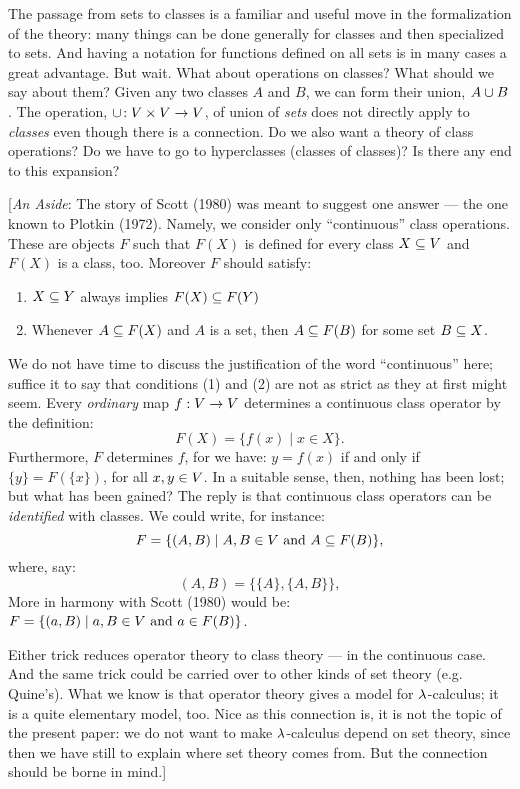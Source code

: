 The passage from sets to classes is a familiar and useful move in the formalization of the
theory: many things can be done generally for classes and then specialized to sets. And
having a notation for functions defined on all sets is in many cases a great advantage.
But wait. What about operations on classes? What should we say about them? Given any two
classes $A$ and $B$, we can form their union, $A \cup  B$. The operation, $\cup\!: V
\times V \rightarrow V$, of union of {\it sets} does not directly apply to {\it classes} even
though there is a connection. Do we also want a theory of class operations? Do we have to
go to hyperclasses (classes of classes)? Is there any end to this expansion?


[{\it An Aside}: The story of Scott (1980) was meant to suggest one answer --- the one
known to Plotkin (1972). Namely, we consider only ``continuous'' class operations. These
are objects $F$ such that $F(X)$ is defined for every class $X \subseteq V$ and $F(X)$ is
a class, too. Moreover $F$ should satisfy:

\begin{enumerate}

\item $X \subseteq Y$ always implies $F(X)\subseteq F(Y)$

\item Whenever $A \subseteq F(X)$ and $A$ is a set, then $A\subseteq F(B)$ for some set $B \subseteq X$.

\end{enumerate}
%
We do not have time to discuss the justification of the word ``continuous'' here; suffice
it to say that conditions (1) and (2) are not as strict as they at first might seem. Every
{\it ordinary} map $f : V \rightarrow V$ determines a continuous class operator by the
definition:
$$
F(X) = \{f(x) \mid x \in X\}.
$$
%
Furthermore, $F$ determines $f$, for we have: $y = f(x)$ if and only if $\{y\} =
F(\{x\})$, for all $x,y \in V$. In a suitable sense, then, nothing has been lost; but
what has been gained? The reply is that continuous class operators can be {\it identified}
with classes. We could write, for instance:
$$ F = \{(A,B) \mid A,B \in V {\textrm { and }} A \subseteq F(B) \},$$ where, say:
$$
(A,B) = \{\{A\}, \{A,B\}\},
$$
More in harmony with Scott (1980) would be: $F = \{(a,B) \mid  a,B \in V {\textrm { and }
} a \in F(B)\}$.

Either trick reduces operator theory to class theory --- in the continuous case. And the
same trick could be carried over to other kinds of set theory (e.g. Quine's). What we know
is that operator theory gives a model for $\lambda$-calculus; it is a quite elementary model,
too. Nice as this connection is, it is not the topic of the present paper: we do not want
to make $\lambda$-calculus depend on set theory, since then we have still to explain where set
theory comes from. But the connection should be borne in mind.]

